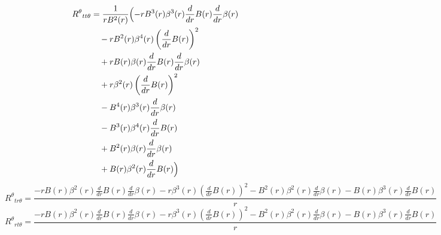 \documentclass[11pt,a4paper]{article}
\newcommand{\riemann}[4]{R^{#1}{}_{#2 #3 #4}}
\begin{document}
\begin{align*}
  \riemann{\theta}{t}{t}{\theta} &= \frac{1}{r B^{2}{\left(r \right)}}\Bigl(- r B^{3}{\left(r \right)} \beta^{3}{\left(r \right)} \frac{d}{d r} B{\left(r \right)} \frac{d}{d r} \beta{\left(r \right)} \\
  &\quad - r B^{2}{\left(r \right)} \beta^{4}{\left(r \right)} \left(\frac{d}{d r} B{\left(r \right)}\right)^{2} \\
  &\quad + r B{\left(r \right)} \beta{\left(r \right)} \frac{d}{d r} B{\left(r \right)} \frac{d}{d r} \beta{\left(r \right)} \\
  &\quad + r \beta^{2}{\left(r \right)} \left(\frac{d}{d r} B{\left(r \right)}\right)^{2} \\
  &\quad - B^{4}{\left(r \right)} \beta^{3}{\left(r \right)} \frac{d}{d r} \beta{\left(r \right)} \\
  &\quad - B^{3}{\left(r \right)} \beta^{4}{\left(r \right)} \frac{d}{d r} B{\left(r \right)} \\
  &\quad + B^{2}{\left(r \right)} \beta{\left(r \right)} \frac{d}{d r} \beta{\left(r \right)} \\
  &\quad + B{\left(r \right)} \beta^{2}{\left(r \right)} \frac{d}{d r} B{\left(r \right)}\Bigr)
\end{align*}
\begin{dmath*}
  \riemann{\theta}{t}{r}{\theta} = \frac{- r B{\left(r \right)} \beta^{2}{\left(r \right)} \frac{d}{d r} B{\left(r \right)} \frac{d}{d r} \beta{\left(r \right)} - r \beta^{3}{\left(r \right)} \left(\frac{d}{d r} B{\left(r \right)}\right)^{2} - B^{2}{\left(r \right)} \beta^{2}{\left(r \right)} \frac{d}{d r} \beta{\left(r \right)} - B{\left(r \right)} \beta^{3}{\left(r \right)} \frac{d}{d r} B{\left(r \right)}}{r}
\end{dmath*}
\begin{dmath*}
  \riemann{\theta}{r}{t}{\theta} = \frac{- r B{\left(r \right)} \beta^{2}{\left(r \right)} \frac{d}{d r} B{\left(r \right)} \frac{d}{d r} \beta{\left(r \right)} - r \beta^{3}{\left(r \right)} \left(\frac{d}{d r} B{\left(r \right)}\right)^{2} - B^{2}{\left(r \right)} \beta^{2}{\left(r \right)} \frac{d}{d r} \beta{\left(r \right)} - B{\left(r \right)} \beta^{3}{\left(r \right)} \frac{d}{d r} B{\left(r \right)}}{r}
\end{dmath*}
\end{document}
